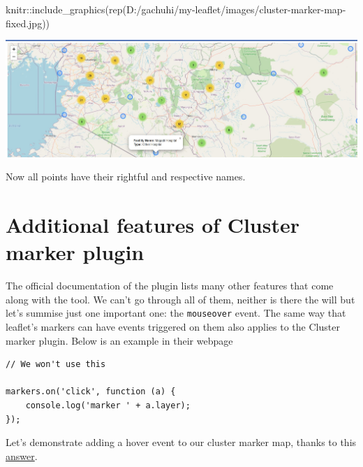 \documentclass[
]{book}
\newenvironment{Shaded}{\begin{snugshade}}{\end{snugshade}}
\newcommand{\FunctionTok}[1]{\textcolor[rgb]{0.00,0.00,0.00}{#1}}
\newcommand{\NormalTok}[1]{#1}
\newcommand{\SpecialCharTok}[1]{\textcolor[rgb]{0.00,0.00,0.00}{#1}}
\newcommand{\StringTok}[1]{\textcolor[rgb]{0.31,0.60,0.02}{#1}}
\begin{document}
\begin{Shaded}
\begin{Highlighting}[]
\NormalTok{knitr}\SpecialCharTok{::}\FunctionTok{include\_graphics}\NormalTok{(}\FunctionTok{rep}\NormalTok{(}\StringTok{\textquotesingle{}D:/gachuhi/my{-}leaflet/images/cluster{-}marker{-}map{-}fixed.jpg\textquotesingle{}}\NormalTok{))}
\end{Highlighting}
\end{Shaded}

\includegraphics[width=26.18in]{../images/cluster-marker-map-fixed}

Now all points have their rightful and respective names.

\hypertarget{additional-features-of-cluster-marker-plugin}{%
\section{Additional features of Cluster marker plugin}\label{additional-features-of-cluster-marker-plugin}}

The official documentation of the plugin lists many other features that come along with the tool. We can't go through all of them, neither is there the will but let's summise just one important one: the \texttt{mouseover} event. The same way that leaflet's markers can have events triggered on them also applies to the Cluster marker plugin. Below is an example in their webpage

\begin{verbatim}
// We won't use this

markers.on('click', function (a) {
    console.log('marker ' + a.layer);
});
\end{verbatim}

Let's demonstrate adding a hover event to our cluster marker map, thanks to this \href{https://gnisitricks.de/2019/03/Adding-Click-and-Mouseover-Events-simultaneously-to-GeoJson-Markers-on-a-Leaflet-Map/}{answer}.
\end{document}
